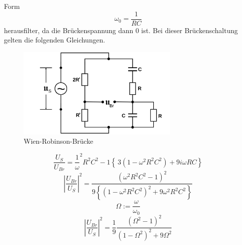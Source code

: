 Form
\begin{equation}
\omega_0=\frac{1}{RC}
\end{equation}
herausfilter, da die Brückenspannung dann $0$ ist. Bei dieser Brückenschaltung
gelten die folgenden Gleichungen.
\begin{figure}
  \centering
  \includegraphics[width=0.7\textwidth]{Bilder/Wien_Robinsonbruecke.png}
  \caption{Wien-Robinson-Brücke}
  \label{fig:WBBruecke}
\end{figure}
\begin{equation}
\frac{U_S}{U_{Br}}=\frac{1}{\omega}^2R^2C^2-1\left\{\,3(1-\omega^2 R^2 C^2)
+9i\omega RC \right\}
\end{equation}
\begin{equation}
\left|\frac{U_{Br}}{U_S}\right|^2=\frac{(\omega^2R^2C^2-1)^2}
{9\left\{(1-\omega^2 R^2 C^2)^2+9\omega^2R^2C^2\right\}}
\end{equation}
\begin{equation}
\Omega:=\frac{\omega}{\omega_0}
\end{equation}
\begin{equation}
\left|\frac{U_{Br}}{U_S}\right|^2=\frac{1}{9}\frac{(\Omega^2-1)^2}
{(1-\Omega^2)^2+9\Omega^2}
\end{equation}
